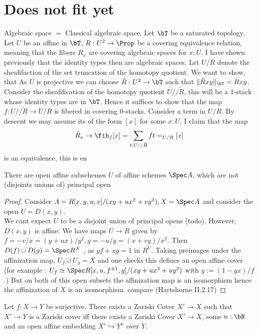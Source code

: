 \section{Does not fit yet}
Algebraic space $=$ Classical algebraic space.
Let $\bT$ be a saturated topology.
Let $U$ be an affine in $\bT$, $R : U^2 \to \Prop$ be a covering equivalence relation, meaning that the fibers $R_x$ are covering algebraic spaces for $x : U$. I have shown previously that the identity types then are algebraic spaces. Let $U / R$ denote the sheafifaction of the set truncation of the homotopy quotient. We want to show, that  As $U$ is projective we can choose $\tilde R : U^2 \to \bT$ such that $\| \tilde R x y \|_\bT= R x y$. Consider the sheafification of the homotopy quotient $U // \tilde R$, this will be a 1-stack whose identity types are in $\bT$. Hence it suffices to show that the map $f : U // \tilde R \to U / R$ is fibered in covering 0-stacks. Consider a term in $U / R$. By descent we may assume its of the form $[x]$ for some $x : U$. I claim that the map \[\tilde R_x \to \fib_f [x] = \sum_{t: U // \tilde R} f t =_{U/R} [x]\]
is an equivalence, this is en

\begin{example}
	There are open affine subschemes $U$ of affine schemes $\Spec A$, which are not (disjoints unions of) principal open
\end{example}
\begin{proof}
	Consider $A = R[x,y,u,v]/(xy + ux^2 + vy^2), X= \Spec A$ and consider the open $U = D(x,y)$. \\
	We cant expect $U$ to be a disjoint union of principal opens (todo). However, $D(x,y)$ is affine: We have maps $U \to R$ given by
	$f = -v/x = (y+ux)/y^2 , g= -u/y = (x+vy)/x^2$. 
	Then $D(f) \cup D(g) = \Spec R^X$ , as $yf + xg = 1$ in $R^U$.
	Taking preimages under the affinization map, $U_f \cup U_g = X$ and one checks this defines an open affine cover (for example : $U_f \simeq \Spec R[x,u,f^{\pm 1}, g] / (xy + ux^2 + uy^2)$ with $y := (1-gx)/f$.)
	But on both of this open subsets the affinization map is an isomorphism
	hence the affinization of $X$ is an isomorphism.
	compare (Hartshorne II.2.17)
\end{proof}
\begin{lemma}
	Let $f : X \to Y$ be surjective. There exists a Zariski Cover $X' \to X$ such that $X' \to Y$ is a Zariski cover iff there exists a Zariski Cover $X' \to X$, some $n : \bN$ and an open affine embedding $X' \hookrightarrow Y^n$ over $Y$.
\end{lemma}

